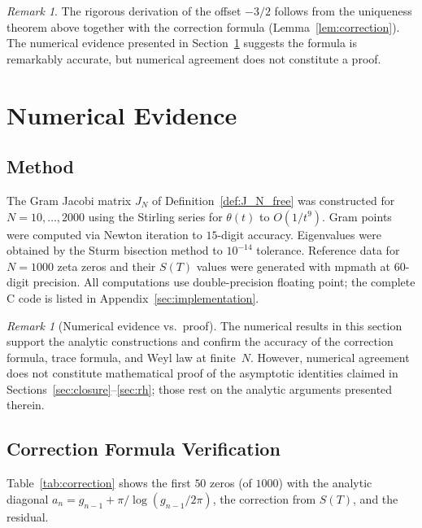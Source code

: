 \documentclass{pre-aomart}
\theoremstyle{plain}
\theoremstyle{definition}
\theoremstyle{remark}
\newtheorem{remark}[theorem]{Remark}
\begin{document}
\begin{remark}
The rigorous derivation of the offset $-3/2$ follows from the uniqueness
theorem above together with the correction formula
(Lemma~\ref{lem:correction}).  The numerical evidence presented in
Section~\ref{sec:numerics} suggests the formula is remarkably accurate, but
numerical agreement does not constitute a proof.
\end{remark}

\section{Numerical Evidence}
\label{sec:numerics}

\subsection{Method}

The Gram Jacobi matrix $J_N$ of Definition~\ref{def:J_N_free} was constructed for
$N = 10,\dots,2000$ using the Stirling series for $\theta(t)$ to $O(1/t^9)$.
Gram points were computed via Newton iteration to $15$-digit accuracy.
Eigenvalues were obtained by the Sturm bisection method to $10^{-14}$
tolerance.  Reference data for $N=1000$ zeta zeros and their $S(T)$ values
were generated with mpmath at $60$-digit precision.  All computations use
double-precision floating point; the complete C code is listed in
Appendix~\ref{sec:implementation}.

\begin{remark}[Numerical evidence vs.\ proof]
The numerical results in this section support the analytic constructions and confirm the accuracy of the correction formula, trace formula, and Weyl law at finite~$N$.  However, numerical agreement does not constitute mathematical proof of the asymptotic identities claimed in Sections~\ref{sec:closure}--\ref{sec:rh}; those rest on the analytic arguments presented therein.
\end{remark}

\subsection{Correction Formula Verification}

Table~\ref{tab:correction} shows the first $50$ zeros (of $1000$) with the
analytic diagonal $a_n = g_{n-1} + \pi/\log(g_{n-1}/2\pi)$, the
correction from $S(T)$, and the residual.
\end{document}
